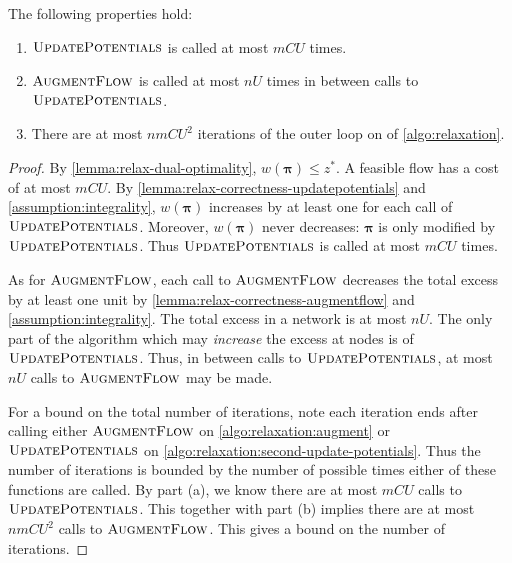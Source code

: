 \begin{lemma} \label{lemma:relax-iterations} 
The following properties hold:
\begin{enumerate}[label=(\alph*)]
    \item $\textproc{UpdatePotentials}$ is called at most $mCU$ times.
    \item $\textproc{AugmentFlow}$ is called at most $nU$ times in between calls to $\textproc{UpdatePotentials}$.
    \item There are at most $nmCU^2$ iterations of the outer loop on  of \cref{algo:relaxation}.
\end{enumerate}
\end{lemma}
\begin{proof}
By \cref{lemma:relax-dual-optimality}, $w\left(\boldsymbol{\pi}\right) \leq z^*$. A feasible flow has a cost of at most $mCU$. By \cref{lemma:relax-correctness-updatepotentials} and \cref{assumption:integrality}, $w\left(\boldsymbol{\pi}\right)$ increases by at least one for each call of $\textproc{UpdatePotentials}$. Moreover, $w\left(\boldsymbol{\pi}\right)$ never decreases: $\boldsymbol{\pi}$ is only modified by $\textproc{UpdatePotentials}$. Thus $\textproc{UpdatePotentials}$ is called at most $mCU$ times.

As for $\textproc{AugmentFlow}$, each call to $\textproc{AugmentFlow}$ decreases the total excess by at least one unit by \cref{lemma:relax-correctness-augmentflow} and \cref{assumption:integrality}. The total excess in a network is at most $nU$. The only part of the algorithm which may \emph{increase} the excess at nodes is  of $\textproc{UpdatePotentials}$. Thus, in between calls to $\textproc{UpdatePotentials}$, at most $nU$ calls to $\textproc{AugmentFlow}$ may be made.

For a bound on the total number of iterations, note each iteration ends after calling either $\textproc{AugmentFlow}$ on \cref{algo:relaxation:augment} or $\textproc{UpdatePotentials}$ on \cref{algo:relaxation:second-update-potentials}\footnotemark. Thus the number of iterations is bounded by the number of possible times either of these functions are called. By part (a), we know there are at most $mCU$ calls to $\textproc{UpdatePotentials}$. This together with part (b) implies there are at most $nmCU^2$ calls to $\textproc{AugmentFlow}$. This gives a bound on the number of iterations.
\end{proof}

